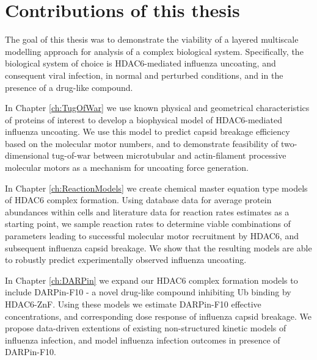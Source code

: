 \section{Contributions of this thesis}

The goal of this thesis was to demonstrate the viability of a layered multiscale modelling approach for analysis of a complex biological system. Specifically, the biological system of choice is HDAC6-mediated influenza uncoating, and consequent viral infection, in normal and perturbed conditions, and in the presence of a drug-like compound.

In Chapter \ref{ch:TugOfWar} we use known physical and geometrical characteristics of proteins of interest to develop a biophysical model of HDAC6-mediated influenza uncoating. We use this model to predict capsid breakage efficiency based on the molecular motor numbers, and to demonstrate feasibility of two-dimensional tug-of-war between microtubular and actin-filament processive molecular motors as a mechanism for uncoating force generation.

In Chapter \ref{ch:ReactionModels} we create chemical master equation type models of HDAC6 complex formation. Using database data for average protein abundances within cells and literature data for reaction rates estimates as a starting point, we sample reaction rates to determine viable combinations of parameters leading to successful molecular motor recruitment by HDAC6, and subsequent influenza capsid breakage. We show that the resulting models are able to robustly predict experimentally observed influenza uncoating.

In Chapter \ref{ch:DARPin} we expand our HDAC6 complex formation models to include DARPin-F10 - a novel drug-like compound inhibiting Ub binding by HDAC6-ZnF. Using these models we estimate DARPin-F10 effective concentrations, and corresponding dose response of influenza capsid breakage. We propose data-driven extentions of existing non-structured kinetic models of influenza infection, and model influenza infection outcomes in presence of DARPin-F10.